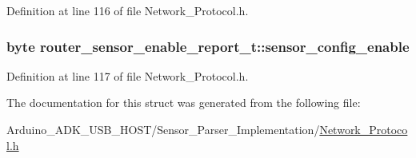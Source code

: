 Definition at line 116 of file Network\-\_\-\-Protocol.\-h.

\hypertarget{structrouter__sensor__enable__report__t_a8d502724424b38506c3c54950b427b68}{
\subsubsection[{sensor\-\_\-config\-\_\-enable}]{\setlength{\rightskip}{0pt plus 5cm}byte router\-\_\-sensor\-\_\-enable\-\_\-report\-\_\-t\-::sensor\-\_\-config\-\_\-enable}}\label{structrouter__sensor__enable__report__t_a8d502724424b38506c3c54950b427b68}


Definition at line 117 of file Network\-\_\-\-Protocol.\-h.



The documentation for this struct was generated from the following file\-:\begin{DoxyCompactItemize}
\item 
Arduino\-\_\-\-A\-D\-K\-\_\-\-U\-S\-B\-\_\-\-H\-O\-S\-T/\-Sensor\-\_\-\-Parser\-\_\-\-Implementation/\hyperlink{_network___protocol_8h}{Network\-\_\-\-Protocol.\-h}\end{DoxyCompactItemize}
